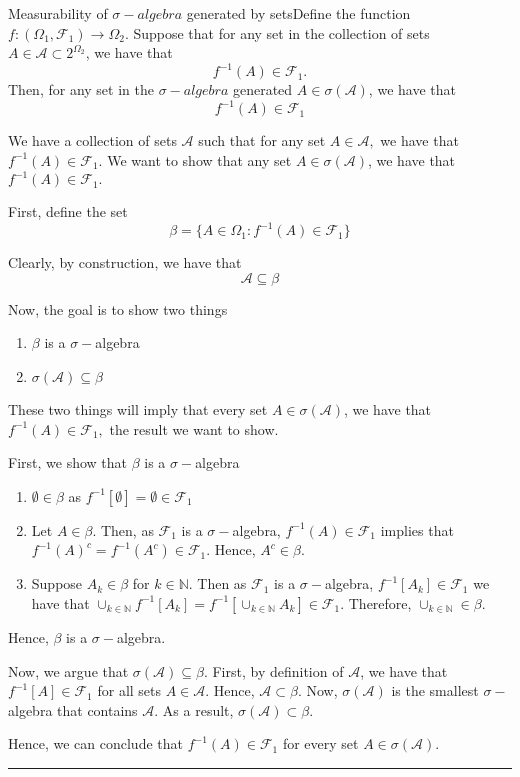 \documentclass[twoside]{article}
\newenvironment{proof}{{\bf Proof:}}{\hfill\rule{2mm}{2mm}}
\newcommand{\algebra}{\mathcal{A}}
\newcommand{\sigmalgebra}{\mathcal{F}}
\newcommand{\sa}{\sigma-algebra}
\begin{document}
\begin{proposition_exam}{Measurability of $\sa$ generated by sets}{}Define the function $f: (\Omega_1, \sigmalgebra_1) \rightarrow \Omega_2$. Suppose that for any set in the collection of sets $A \in \algebra \subset 2^{\Omega_2}$, we have that $$f^{-1}(A) \in \sigmalgebra_1.$$ Then, for any set in the $\sa$ generated $A \in \sigma(\algebra)$, we have that $$f^{-1}(A) \in \sigmalgebra_1$$
\end{proposition_exam}

\begin{proof} 
We have a collection of sets $\mathcal{A}$ such that for any set $A \in \mathcal{A},$ we have that $f^{-1}(A) \in \sigmalgebra_1.$ We want to show that any set $A \in \sigma(\mathcal{A})$, we have that $f^{-1}(A) \in \sigmalgebra_1.$

First, define the set 
$$
\beta = \{A \in \Omega_1: f^{-1}(A) \in \sigmalgebra_1\}
$$

Clearly, by construction, we have that 
$$
\mathcal{A} \subseteq \beta
$$

Now, the goal is to show two things
\begin{enumerate}
    \item $\beta$ is a $\sigma-$algebra
    \item $\sigma(\mathcal{A}) \subseteq \beta$
\end{enumerate}
These two things will imply that every set $A \in \sigma(\mathcal{A})$, we have that $f^{-1}(A) \in \sigmalgebra_1,$ the result we want to show.

First, we show that $\beta$ is a $\sigma-$algebra
\begin{enumerate}
    \item $\emptyset \in \beta$ as $f^{-1}[\emptyset] = \emptyset \in \sigmalgebra_1$
    \item Let $A \in \beta.$ Then, as $\sigmalgebra_1$ is a $\sigma-$algebra, $f^{-1}(A) \in \sigmalgebra_1$ implies that $f^{-1}(A)^c = f^{-1}(A^c) \in \sigmalgebra_1$. Hence, $A^c \in \beta.$
    \item Suppose $A_k \in \beta$ for $k \in \mathbb{N}.$ Then as $\sigmalgebra_1$ is a $\sigma-$algebra, $f^{-1}[A_k] \in \sigmalgebra_1$ we have that $\cup_{k \in \mathbb{N}}f^{-1}[A_k] = f^{-1}[\cup_{k \in \mathbb{N}}A_k] \in \sigmalgebra_1$. Therefore, $\cup_{k \in \mathbb{N}} \in \beta.$
\end{enumerate}
Hence, $\beta$ is a $\sigma-$algebra.

Now, we argue that  $\sigma(\mathcal{A}) \subseteq \beta$. First, by definition of $\mathcal{A}$, we have that $f^{-1}[A] \in \sigmalgebra_1$ for all sets $A \in \mathcal{A}.$ Hence, $\mathcal{A} \subset \beta.$ Now, $\sigma(\mathcal{A})$ is the smallest $\sigma-$algebra that contains $\mathcal{A}.$ As a result, $\sigma(\mathcal{A}) \subset \beta.$

Hence, we can conclude that $f^{-1}(A) \in \sigmalgebra_1$ for every set $A \in \sigma(\mathcal{A}).$
\end{proof}
\end{document}
